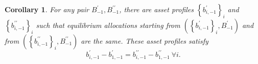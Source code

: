 \documentclass[thmsb,11pt]{article}
\newtheorem{corollary}{Corollary}
\newenvironment{proof}[1][Proof]{\noindent \textbf{#1.} }{\  \rule{0.5em}{0.5em}}
\begin{document}



\begin{corollary}
\label{corr: B does not matter} For any pair $B_{-1}^{\prime },B_{-1}^{\prime
\prime }$, there are asset profiles $\left\{ b_{i,-1}^{\prime }\right\} _{i}$ and $%
\left\{ b_{i,-1}^{\prime \prime }\right\} _{i}$ such that
equilibrium allocations starting from  $\left( \left\{ b_{i,-1}^{\prime }\right\}
_{i},B_{-1}^{\prime }\right) $ and  from  $\left( \left\{ b_{i,-1}^{\prime
\prime }\right\} _{i},B_{-1}^{\prime \prime }\right) $ are the same.
These asset profiles satisfy%
\begin{equation*}
b_{i,-1}^{\prime }-b_{1,-1}^{\prime }=b_{i,-1}^{\prime \prime
}-b_{1,-1}^{\prime \prime } \ \forall i.
\end{equation*}
\end{corollary}
\end{document}
